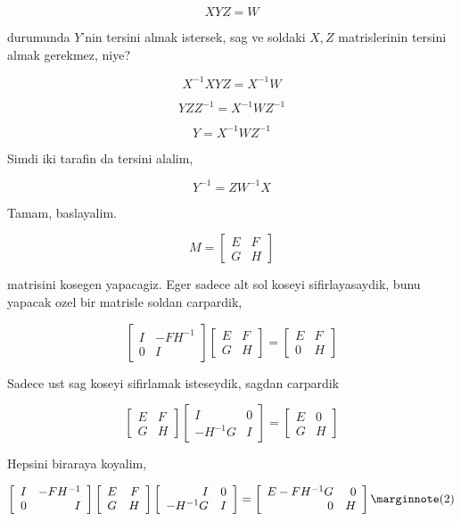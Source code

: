 \documentclass[12pt,fleqn]{article}\usepackage{../common}
\begin{document}
\[ XYZ = W \]

durumunda $Y$'nin tersini almak istersek, sag ve soldaki $X,Z$
matrislerinin tersini almak gerekmez, niye?

\[ X^{-1}XYZ = X^{-1}W \]

\[ YZZ^{-1} = X^{-1}WZ^{-1} \]

\[ Y = X^{-1}WZ^{-1} \]

Simdi iki tarafin da tersini alalim, 

\[ Y^{-1} = ZW^{-1}X \]

Tamam, baslayalim. 

\[ M = 
\left[\begin{array}{rr}
E & F \\
G & H
\end{array}\right] 
 \]

matrisini kosegen yapacagiz. Eger sadece alt sol koseyi sifirlayasaydik, 
bunu yapacak ozel bir matrisle soldan carpardik,

\[ 
\left[\begin{array}{rr}
I & -FH^{-1} \\
0 & I
\end{array}\right] 
\left[\begin{array}{rr}
E & F \\
G & H
\end{array}\right] = 
\left[\begin{array}{rr}
E & F \\
0 & H
\end{array}\right] 
 \]

Sadece ust sag koseyi sifirlamak isteseydik, sagdan carpardik

\[ 
\left[\begin{array}{rr}
E & F \\
G & H
\end{array}\right] 
\left[\begin{array}{rr}
I & 0 \\
-H^{-1}G & I
\end{array}\right] 
=
\left[\begin{array}{rr}
E & 0 \\
G & H
\end{array}\right] 
 \]

Hepsini biraraya koyalim, 

\[ 
\left[\begin{array}{rr}
I & -FH^{-1} \\
0 & I
\end{array}\right] 
\left[\begin{array}{rr}
E & F \\
G & H
\end{array}\right] 
\left[\begin{array}{rr}
I & 0 \\
-H^{-1}G & I
\end{array}\right] 
= 
\left[\begin{array}{rr}
E-FH^{-1}G & 0 \\
0 & H
\end{array}\right] 
\mlabel{2}
 \]
\end{document}

